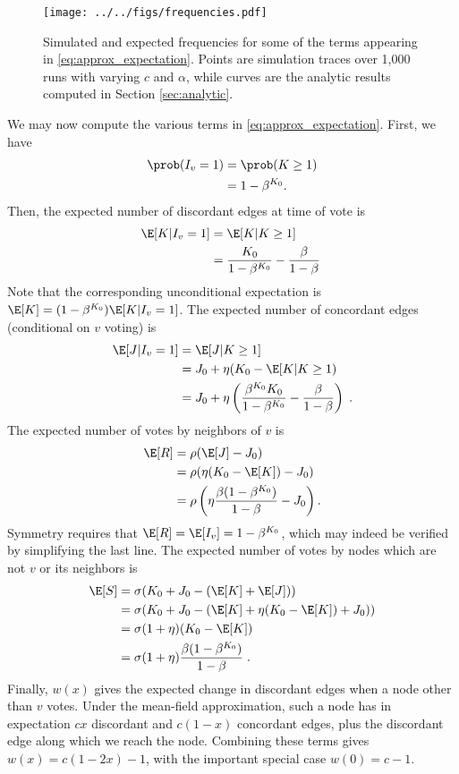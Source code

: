 \documentclass[english]{scrartcl}
\begin{document}
	\begin{figure}
		\centering
		\texttt{[image: ../../figs/frequencies.pdf]}
		\caption{Simulated and expected frequencies for some of the terms appearing in \eqref{eq:approx_expectation}. Points are simulation traces over 1,000 runs with varying $c$ and $\alpha$, while curves are the analytic results computed in Section \ref{sec:analytic}.} \label{fig:frequencies}
	\end{figure}

	We may now compute the various terms in \eqref{eq:approx_expectation}. First, we have 
	\begin{align*}
		\prob(I_v = 1) &= \prob(K \geq 1) \\ 
					   &= 1-\beta^{K_0}.
	\end{align*}
	Then, the expected number of discordant edges at time of vote is
	\begin{align*}
		\E[K|I_v = 1] &= \E[K|K \geq 1] \\ 
					  &= \frac{K_0}{1-\beta^{K_0}} - \frac{\beta}{1-\beta}\;
	\end{align*}
	Note that the corresponding unconditional expectation is $\E[K] = (1-\beta^{K_0})\E[K|I_v = 1]$.
	The expected number of concordant edges (conditional on $v$ voting) is 
	\begin{align*}
		\E[J|I_v = 1] &= \E[J|K \geq 1] \\ 
					  &= J_0 + \eta(K_0 - \E[K|K\geq 1) \\ 
					  &= J_0 + \eta \left(\frac{\beta^{K_0} K_0}{1-\beta^{K_0}} - \frac{\beta}{1-\beta}\right)\;.
	\end{align*}
	The expected number of votes by neighbors of $v$ is 
	\begin{align*}
		\E[R] &= \rho(\E[J] - J_0) \\ 
			  &= \rho(\eta(K_0 - \E[K]) - J_0) \\ 
			  &= \rho\left(\eta\frac{\beta(1-\beta^{K_0})}{1-\beta} - J_0\right).
	\end{align*}
	Symmetry requires that $\E[R] = \E[I_v] = 1-\beta^{K_0}$, which may indeed be verified by simplifying the last line. 
	The expected number of votes by nodes which are not $v$ or its neighbors is 
	\begin{align*}
		\E[S] &= \sigma(K_0 + J_0 - (\E[K] + \E[J])) \\ 
			  &= \sigma(K_0 + J_0 - (\E[K] + \eta(K_0 - \E[K]) + J_0)) \\ 
			  &= \sigma (1 + \eta) (K_0 - \E[K]) \\ 
			  &= \sigma (1 + \eta) \frac{\beta(1-\beta^{K_0})}{1-\beta}\;.
	\end{align*}
	Finally, $w(x)$ gives the expected change in discordant edges when a node other than $v$ votes. Under the mean-field approximation, such a node has in expectation $cx$ discordant and $c(1-x)$ concordant edges, plus the discordant edge along which we reach the node. Combining these terms gives $w(x) = c(1-2x) - 1$, with the important special case $w(0) = c-1$. 
\end{document}

